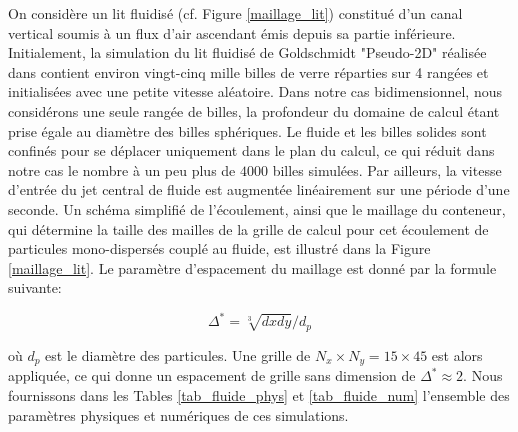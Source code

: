 On considère un lit fluidisé (cf. Figure \ref{maillage_lit}) constitué d'un canal vertical soumis à un flux d'air ascendant émis depuis sa partie inférieure. Initialement, la simulation du lit fluidisé de Goldschmidt "Pseudo-2D" réalisée dans \cite{goldschmidt2004hydrodynamic} contient environ vingt-cinq mille billes de verre réparties sur 4 rangées et initialisées avec une petite vitesse aléatoire. Dans notre cas bidimensionnel, nous considérons une seule rangée de billes, la profondeur du domaine de calcul étant prise égale au diamètre des billes sphériques. Le fluide et les billes solides sont confinés pour se déplacer uniquement dans le plan du calcul, ce qui réduit dans notre cas le nombre à un peu plus de $4000$ billes simulées. Par ailleurs, la vitesse d'entrée du jet central de fluide est augmentée linéairement sur une période d'une seconde. Un schéma simplifié de l'écoulement, ainsi que le maillage du conteneur, qui détermine la taille des mailles de la grille de calcul pour cet écoulement de particules mono-dispersés couplé au fluide, est illustré dans la Figure \ref{maillage_lit}.  Le paramètre d'espacement du maillage est donné par la formule suivante:

\vspace{-0.3cm}

\begin{equation}
    \Delta^* = \sqrt[3]{dx dy}/d_p
\end{equation}

\noindent où $d_p$ est le diamètre des particules. Une grille de $N_x \times N_y = 15 \times 45$ est alors appliquée, ce qui donne un espacement de grille sans dimension de $\Delta^* \approx 2$. Nous fournissons dans les Tables \ref{tab_fluide_phys} et \ref{tab_fluide_num} l'ensemble des paramètres physiques et numériques de ces simulations.

